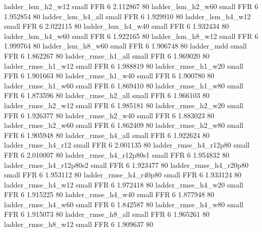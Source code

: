        ladder_lsm_h2_w12      small      FFR                 6 2.112867 80
       ladder_lsm_h2_w60      small      FFR                 6 1.952854 80
       ladder_lsm_h4_all      small      FFR                 6 1.929910 80
       ladder_lsm_h4_w12      small      FFR                 6 2.022115 80
       ladder_lsm_h4_w40      small      FFR                 6 1.932434 80
       ladder_lsm_h4_w60      small      FFR                 6 1.922165 80
       ladder_lsm_h8_w12      small      FFR                 6 1.999764 80
       ladder_lsm_h8_w60      small      FFR                 6 1.906748 80
              ladder_mdd      small      FFR                 6 1.862267 80
      ladder_rmse_h1_all      small      FFR                 6 1.969020 80
      ladder_rmse_h1_w12      small      FFR                 6 1.988819 80
      ladder_rmse_h1_w20      small      FFR                 6 1.901663 80
      ladder_rmse_h1_w40      small      FFR                 6 1.900780 80
      ladder_rmse_h1_w60      small      FFR                 6 1.869410 80
      ladder_rmse_h1_w80      small      FFR                 6 1.873596 80
      ladder_rmse_h2_all      small      FFR                 6 1.966103 80
      ladder_rmse_h2_w12      small      FFR                 6 1.985181 80
      ladder_rmse_h2_w20      small      FFR                 6 1.926377 80
      ladder_rmse_h2_w40      small      FFR                 6 1.883023 80
      ladder_rmse_h2_w60      small      FFR                 6 1.862409 80
      ladder_rmse_h2_w80      small      FFR                 6 1.905948 80
      ladder_rmse_h4_all      small      FFR                 6 1.922624 80
      ladder_rmse_h4_r12      small      FFR                 6 2.001135 80
   ladder_rmse_h4_r12p80      small      FFR                 6 2.010007 80
 ladder_rmse_h4_r12p80s1      small      FFR                 6 1.954832 80
 ladder_rmse_h4_r12p80s2      small      FFR                 6 1.923477 80
   ladder_rmse_h4_r20p80      small      FFR                 6 1.953112 80
   ladder_rmse_h4_r40p80      small      FFR                 6 1.933124 80
      ladder_rmse_h4_w12      small      FFR                 6 1.972418 80
      ladder_rmse_h4_w20      small      FFR                 6 1.915225 80
      ladder_rmse_h4_w40      small      FFR                 6 1.877948 80
      ladder_rmse_h4_w60      small      FFR                 6 1.842587 80
      ladder_rmse_h4_w80      small      FFR                 6 1.915073 80
      ladder_rmse_h8_all      small      FFR                 6 1.965261 80
      ladder_rmse_h8_w12      small      FFR                 6 1.909637 80
